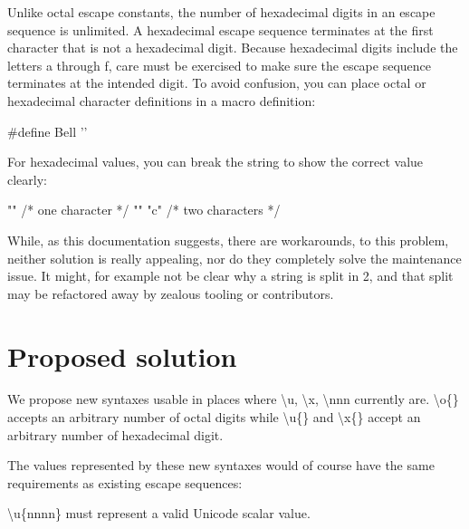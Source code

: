 \documentclass{wg21}
\begin{document}
    \begin{quoteblock}
        
        Unlike octal escape constants, the number of hexadecimal digits in an escape sequence is unlimited. A hexadecimal escape sequence terminates at the first character that is not a hexadecimal digit. Because hexadecimal digits include the letters a through f, care must be exercised to make sure the escape sequence terminates at the intended digit. To avoid confusion, you can place octal or hexadecimal character definitions in a macro definition:
        
        \begin{colorblock}
            #define Bell ''
        \end{colorblock}
        
        For hexadecimal values, you can break the string to show the correct value clearly:
        
        \begin{colorblock}
            "\xabc"    /* one character  */
            "\xab" "c" /* two characters */
        \end{colorblock}
        
    \end{quoteblock}
    
    While, as this documentation suggests, there are workarounds, to this problem, neither solution is really appealing, nor do
    they completely solve the maintenance issue. It might, for example not be clear why a string is split in 2, and that split may
    be refactored away by zealous tooling or contributors.
    
    \section{Proposed solution}
    
    We propose new syntaxes  usable in places where
    \textbackslash u, \textbackslash x, \textbackslash nnn currently are.
    \textbackslash o\{\} accepts an arbitrary number of octal digits while \textbackslash u\{\} and \textbackslash x\{\} accept
    an arbitrary number of hexadecimal digit.
    
    The values represented by these new syntaxes would of course have the same requirements as existing escape sequences:
    
    \textbackslash u\{nnnn\} must represent a valid Unicode scalar value.
    
\end{document}
